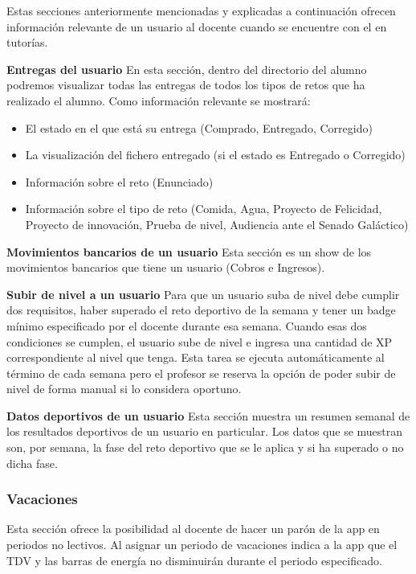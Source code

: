 Estas secciones anteriormente mencionadas y explicadas a continuación ofrecen información relevante de un usuario al docente cuando se encuentre con el en tutorías.

\textbf{Entregas del usuario}
En esta sección, dentro del directorio del alumno podremos visualizar todas las entregas de todos los tipos de retos que ha realizado el alumno. Como información relevante se mostrará:

\begin{itemize}
	\item El estado en el que está su entrega (Comprado, Entregado, Corregido)
	\item La visualización del fichero entregado (si el estado es Entregado o Corregido)
	\item Información sobre el reto (Enunciado)
	\item Información sobre el tipo de reto (Comida, Agua, Proyecto de Felicidad, Proyecto de innovación, Prueba de nivel, Audiencia ante el Senado Galáctico)
\end{itemize}

\textbf{Movimientos bancarios de un usuario}
Esta sección es un show de los movimientos bancarios que tiene un usuario (Cobros e Ingresos).

\textbf{Subir de nivel a un usuario}
Para que un usuario suba de nivel debe cumplir dos requisitos, haber superado el reto deportivo de la semana y tener un badge mínimo especificado por el docente durante esa semana. Cuando esas dos condiciones se cumplen, el usuario sube de nivel e ingresa una cantidad de XP correspondiente al nivel que tenga. Esta tarea se ejecuta automáticamente al término de cada semana pero el profesor se reserva la opción de poder subir de nivel de forma manual si lo considera oportuno.

\textbf{Datos deportivos de un usuario}
Esta sección muestra un resumen semanal de los resultados deportivos de un usuario en particular. Los datos que se muestran son, por semana, la fase del reto deportivo que se le aplica y si ha superado o no dicha fase.

\subsubsection{Vacaciones}
Esta sección ofrece la posibilidad al docente de hacer un parón de la app en periodos no lectivos. Al asignar un periodo de vacaciones indica a la app que el TDV y las barras de energía no disminuirán durante el periodo especificado.

